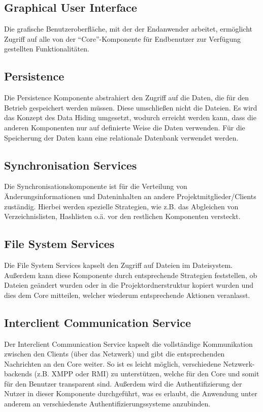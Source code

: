 \subsection{Graphical User Interface}
Die grafische Benutzeroberfläche, mit der der Endanwender arbeitet, ermöglicht Zugriff auf alle von der ``Core''-Komponente für Endbenutzer zur Verfügung gestellten
Funktionalitäten.

\subsection{Persistence}
Die Persistence Komponente abstrahiert den Zugriff auf die Daten, die für den Betrieb gespeichert werden müssen. Diese umschließen nicht die Dateien. Es wird das Konzept des Data Hiding umgesetzt, wodurch erreicht werden kann, dass die anderen Komponenten nur auf definierte Weise die Daten verwenden. Für die Speicherung der Daten kann eine relationale Datenbank verwendet werden.

\subsection{Synchronisation Services}
Die Synchronisationskomponente ist für die Verteilung von Änderungsinformationen und Dateninhalten an andere Projektmitglieder/Clients zuständig. Hierbei werden spezielle Strategien, wie z.B. das Abgleichen von Verzeichnislisten, Hashlisten o.ä. vor den restlichen Komponenten versteckt.

\subsection{File System Services}
Die File System Services kapselt den Zugriff auf Dateien im Dateisystem. Außerdem kann diese Komponente durch entsprechende Strategien feststellen, ob Dateien geändert wurden oder in die Projektordnerstruktur kopiert wurden und dies dem Core mitteilen, welcher wiederum entsprechende Aktionen veranlasst.

\subsection{Interclient Communication Service}
Der Interclient Communication Service kapselt die vollständige Kommunikation zwischen den Clients (über das Netzwerk) und gibt die entsprechenden Nachrichten an den Core weiter. So ist es leicht möglich, verschiedene Netzwerk-backends (z.B. XMPP oder RMI) zu unterstützen, welche für den Core und somit für den Benutzer transparent sind. Außerdem wird die Authentifizierung der Nutzer in dieser Komponente durchgeführt, was es erlaubt, die Anwendung unter anderem an verschiedenste Authentifizierungssysteme anzubinden.


